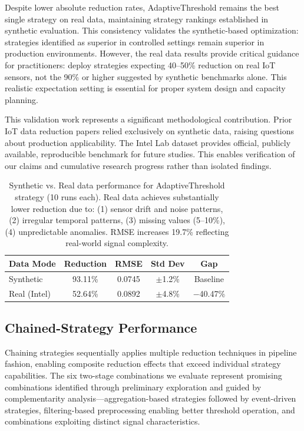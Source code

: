 \documentclass[10pt,twocolumn]{article}
\begin{document}
Despite lower absolute reduction rates, AdaptiveThreshold remains the best single strategy on real data, maintaining strategy rankings established in synthetic evaluation. This consistency validates the synthetic-based optimization: strategies identified as superior in controlled settings remain superior in production environments. However, the real data results provide critical guidance for practitioners: deploy strategies expecting 40--50\% reduction on real IoT sensors, not the 90\% or higher suggested by synthetic benchmarks alone. This realistic expectation setting is essential for proper system design and capacity planning.

This validation work represents a significant methodological contribution. Prior IoT data reduction papers relied exclusively on synthetic data, raising questions about production applicability. The Intel Lab dataset provides official, publicly available, reproducible benchmark for future studies. This enables verification of our claims and cumulative research progress rather than isolated findings.

\begin{table}[H]
\centering
\small
\begin{tabular}{|l|c|c|c|c|}
\hline
\textbf{Data Mode} & \textbf{Reduction} & \textbf{RMSE} & \textbf{Std Dev} & \textbf{Gap} \\
\hline
Synthetic & 93.11\% & 0.0745 & $\pm$1.2\% & Baseline \\
\hline
Real (Intel) & 52.64\% & 0.0892 & $\pm$4.8\% & $-$40.47\% \\
\hline
\end{tabular}
\caption{Synthetic vs. Real data performance for AdaptiveThreshold strategy (10 runs each). Real data achieves substantially lower reduction due to: (1) sensor drift and noise patterns, (2) irregular temporal patterns, (3) missing values (5--10\%), (4) unpredictable anomalies. RMSE increases 19.7\% reflecting real-world signal complexity.}
\label{tab:synreal}
\end{table}

\vspace{0.15cm}

\subsection{Chained-Strategy Performance}

Chaining strategies sequentially applies multiple reduction techniques in pipeline fashion, enabling composite reduction effects that exceed individual strategy capabilities. The six two-stage combinations we evaluate represent promising combinations identified through preliminary exploration and guided by complementarity analysis---aggregation-based strategies followed by event-driven strategies, filtering-based preprocessing enabling better threshold operation, and combinations exploiting distinct signal characteristics.
\end{document}
